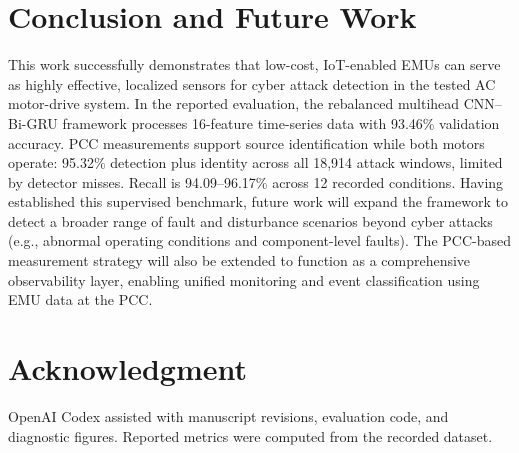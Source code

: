 \documentclass[conference,letterpaper]{IEEEtran}
\begin{document}
\section{Conclusion and Future Work}

This work successfully demonstrates that low-cost, IoT-enabled EMUs can serve as highly effective, localized sensors for cyber attack detection in the tested AC motor-drive system. In the reported evaluation, the rebalanced multihead CNN--Bi-GRU framework processes 16-feature time-series data with 93.46\% validation accuracy. PCC measurements support source identification while both motors operate: 95.32\% detection plus identity across all 18,914 attack windows, limited by detector misses. Recall is 94.09--96.17\% across 12 recorded conditions. Having established this supervised benchmark, future work will expand the framework to detect a broader range of fault and disturbance scenarios beyond cyber attacks (e.g., abnormal operating conditions and component-level faults). The PCC-based measurement strategy will also be extended  to function as a comprehensive observability layer, enabling unified monitoring and event classification using EMU data at the PCC.

\section*{Acknowledgment}
OpenAI Codex assisted with manuscript revisions, evaluation code, and diagnostic figures. Reported metrics were computed from the recorded dataset.



\end{document}
